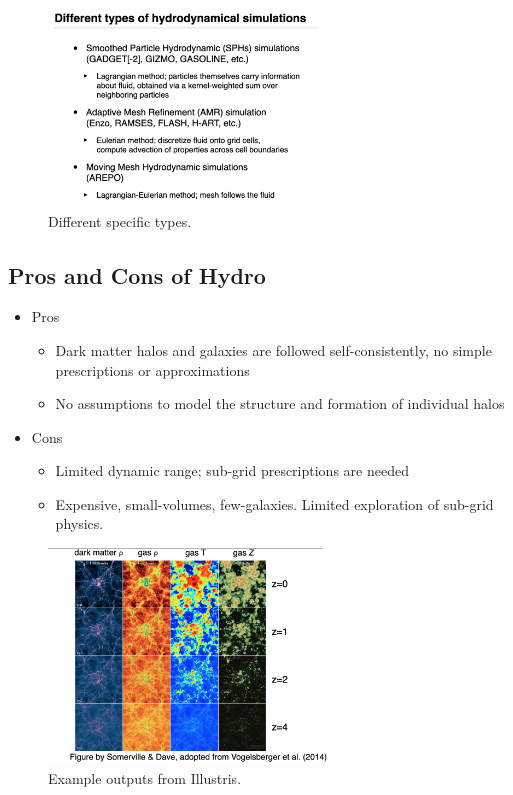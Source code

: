 \documentclass{article}
\begin{document}
\begin{figure}
    \centering
    \includegraphics[width=0.66\textwidth]{figs/Screen Shot 2021-11-17 at 10.52.42 AM.png}
    \caption{Different specific types.}
    \label{fig:types_of_sims}
\end{figure}

\subsection{Pros and Cons of Hydro}

\begin{itemize}
    \item Pros
    \begin{itemize}
        \item Dark matter halos and galaxies are followed self-consistently, no simple prescriptions or approximations
        \item No assumptions to model the structure and formation of individual halos
    \end{itemize}
    \item Cons
    \begin{itemize}
        \item Limited dynamic range; sub-grid prescriptions are needed
        \item Expensive, small-volumes, few-galaxies. Limited exploration of sub-grid physics. 
    \end{itemize}
\end{itemize}

\begin{figure}
    \centering
    \includegraphics[width=0.66\textwidth]{figs/Screen Shot 2021-11-17 at 10.55.56 AM.png}
    \caption{Example outputs from Illustris.}
    \label{fig:illustris_example_outputs}
\end{figure}
\end{document}

